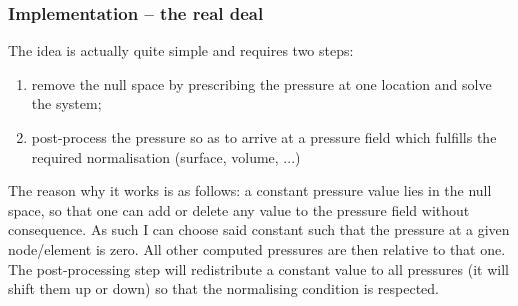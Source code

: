 \subsubsection{Implementation -- the real deal}

The idea is actually quite simple and requires two steps:
\begin{enumerate}
\item remove the null space by prescribing the pressure at one location and solve the system;
\item post-process the pressure so as to arrive at a pressure field which fulfills the required normalisation (surface, volume, ...)
\end{enumerate}

The reason why it works is as follows: a constant pressure value lies in the null space, so that one can 
add or delete any value to the pressure field without consequence. As such I can choose said constant such that 
the pressure at a given node/element is zero. All other computed pressures are then relative to that one. 
The post-processing step will redistribute a constant value to all pressures (it will shift them up or down)
so that the normalising condition is respected. 





